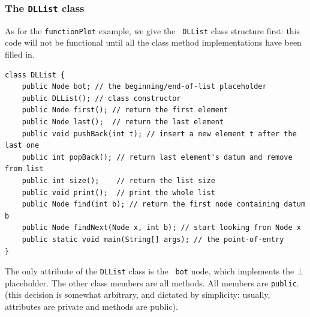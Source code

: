 \documentclass[a4paper]{book}
\theoremstyle{changebreak}                %
\begin{document}
\subsubsection{The {\tt DLList} class}
As for the {\tt functionPlot} example, we give the {\tt
  DLList} class structure first: this code will
not be functional until all the class method
implementations have been filled in.
{\small
\begin{verbatim}
class DLList {
    public Node bot; // the beginning/end-of-list placeholder
    public DLList(); // class constructor
    public Node first(); // return the first element
    public Node last();  // return the last element
    public void pushBack(int t); // insert a new element t after the last one
    public int popBack(); // return last element's datum and remove from list
    public int size();    // return the list size
    public void print();  // print the whole list
    public Node find(int b); // return the first node containing datum b
    public Node findNext(Node x, int b); // start looking from Node x
    public static void main(String[] args); // the point-of-entry
}
\end{verbatim}
} 
The only attribute of the {\tt DLList} class is the {\tt
  bot} node, which implements the
$\bot$\index{$\bot$} placeholder. The other class
members are all methods. All members are {\tt public}. (this decision is somewhat arbitrary, and dictated by
simplicity: usually, attributes are private and methods are public).
\end{document}
